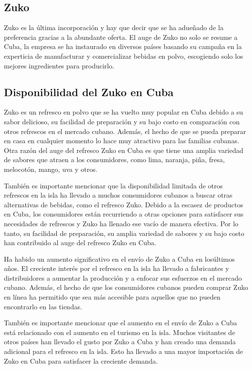 \documentclass[a4paper,12pt]{article}
\begin{document}
\subsection{Zuko}
Zuko es la última incorporación y hay que decir que se ha adueñado de la preferencia gracias a la abundante oferta. 
El auge de Zuko no solo se resume a Cuba, la empresa se ha instaurado en diversos países basando su campaña en la experticia de manufacturar y comercializar bebidas en polvo, escogiendo solo los mejores ingredientes para producirlo.

\subsection{Disponibilidad del Zuko en Cuba}
Zuko es un refresco en polvo que se ha vuelto muy popular en Cuba debido a su sabor delicioso, su facilidad de preparación y su bajo costo en comparación con otros refrescos en el mercado cubano. 
Además, el hecho de que se pueda preparar en casa en cualquier momento lo hace muy atractivo para las familias cubanas. 
Otra razón del auge del refresco Zuko en Cuba es que tiene una amplia variedad de sabores que atraen a los consumidores, como lima, naranja, piña, fresa, melocotón, mango, uva y otros.

También es importante mencionar que la disponibilidad limitada de otros refrescos en la isla ha llevado a muchos consumidores cubanos a buscar otras alternativas de bebidas, como el refresco Zuko. 
Debido a la escasez de productos en Cuba, los consumidores están recurriendo a otras opciones para satisfacer sus necesidades de refrescos y Zuko ha llenado ese vacío de manera efectiva. 
Por lo tanto, su facilidad de preparación, su amplia variedad de sabores y su bajo costo han contribuido al auge del refresco Zuko en Cuba.

Ha habido un aumento significativo en el envío de Zuko a Cuba en losúltimos años. 
El creciente interés por el refresco en la isla ha llevado a fabricantes y distribuidores a aumentar la producción y a enfocar sus esfuerzos en el mercado cubano. 
Además, el hecho de que los consumidores cubanos pueden comprar Zuko en línea ha permitido que sea más accesible para aquellos que no pueden encontrarlo en las tiendas.

También es importante mencionar que el aumento en el envío de Zuko a Cuba está relacionado con el aumento en el turismo en la isla. 
Muchos visitantes de otros países han llevado el gusto por Zuko a Cuba y han creado una demanda adicional para el refresco en la isla. 
Esto ha llevado a una mayor importación de Zuko en Cuba para satisfacer la creciente demanda.
\end{document}
